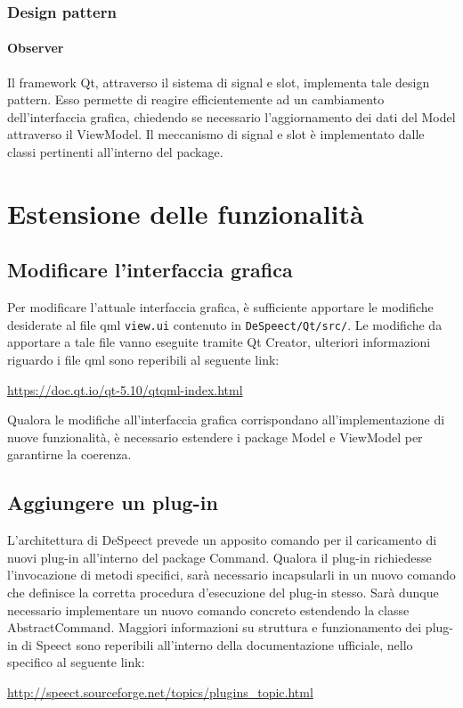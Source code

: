 \documentclass[openany,12pt,a4paper]{report}
\begin{document}
\subsection{Design pattern}

\subsubsection{Observer}
Il framework Qt, attraverso il sistema di signal e slot, implementa tale design pattern. Esso permette di reagire efficientemente ad un cambiamento dell'interfaccia grafica, chiedendo se necessario l'aggiornamento dei dati del Model attraverso il ViewModel. Il meccanismo di signal e slot è implementato dalle classi pertinenti all'interno del package.  

\newpage
		
	\chapter{Estensione delle funzionalità}
	
	\section{Modificare l'interfaccia grafica}
	Per modificare l'attuale interfaccia grafica, è sufficiente apportare le modifiche desiderate al file qml \verb|view.ui| contenuto in \verb|DeSpeect/Qt/src/|. Le modifiche da apportare a tale file vanno eseguite tramite Qt Creator, ulteriori informazioni riguardo i file qml sono reperibili al seguente link:
	\begin{center}
		\url{https://doc.qt.io/qt-5.10/qtqml-index.html}
	\end{center}

	\noindent Qualora le modifiche all'interfaccia grafica corrispondano all'implementazione di nuove funzionalità, è necessario estendere i package Model e ViewModel per garantirne la coerenza.
	
	\section{Aggiungere un plug-in}
	L'architettura di DeSpeect prevede un apposito comando per il caricamento di nuovi plug-in all'interno del package Command. Qualora il plug-in richiedesse l'invocazione di metodi specifici, sarà necessario incapsularli in un nuovo comando che definisce la corretta procedura d'esecuzione del plug-in stesso. Sarà dunque necessario implementare un nuovo comando concreto estendendo la classe AbstractCommand. Maggiori informazioni su struttura e funzionamento dei plug-in di Speect sono reperibili all'interno della documentazione ufficiale, nello specifico al seguente link:
	\begin{center}
		\url{http://speect.sourceforge.net/topics/plugins_topic.html}
	\end{center}
	
\end{document}
